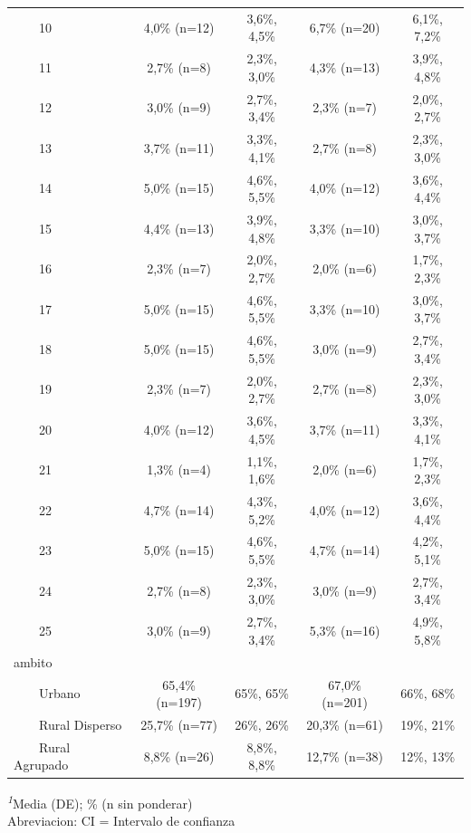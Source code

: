 \documentclass[
  spanish,
  a4paper,
]{scrreprt}
\begin{document}
\begin{table}
{\begin{tabular*}{\linewidth}{@{\extracolsep{\fill}}lcccc}
    10 & 4,0\% (n=12) & 3,6\%, 4,5\% & 6,7\% (n=20) & 6,1\%, 7,2\% \\ 
    11 & 2,7\% (n=8) & 2,3\%, 3,0\% & 4,3\% (n=13) & 3,9\%, 4,8\% \\ 
    12 & 3,0\% (n=9) & 2,7\%, 3,4\% & 2,3\% (n=7) & 2,0\%, 2,7\% \\ 
    13 & 3,7\% (n=11) & 3,3\%, 4,1\% & 2,7\% (n=8) & 2,3\%, 3,0\% \\ 
    14 & 5,0\% (n=15) & 4,6\%, 5,5\% & 4,0\% (n=12) & 3,6\%, 4,4\% \\ 
    15 & 4,4\% (n=13) & 3,9\%, 4,8\% & 3,3\% (n=10) & 3,0\%, 3,7\% \\ 
    16 & 2,3\% (n=7) & 2,0\%, 2,7\% & 2,0\% (n=6) & 1,7\%, 2,3\% \\ 
    17 & 5,0\% (n=15) & 4,6\%, 5,5\% & 3,3\% (n=10) & 3,0\%, 3,7\% \\ 
    18 & 5,0\% (n=15) & 4,6\%, 5,5\% & 3,0\% (n=9) & 2,7\%, 3,4\% \\ 
    19 & 2,3\% (n=7) & 2,0\%, 2,7\% & 2,7\% (n=8) & 2,3\%, 3,0\% \\ 
    20 & 4,0\% (n=12) & 3,6\%, 4,5\% & 3,7\% (n=11) & 3,3\%, 4,1\% \\ 
    21 & 1,3\% (n=4) & 1,1\%, 1,6\% & 2,0\% (n=6) & 1,7\%, 2,3\% \\ 
    22 & 4,7\% (n=14) & 4,3\%, 5,2\% & 4,0\% (n=12) & 3,6\%, 4,4\% \\ 
    23 & 5,0\% (n=15) & 4,6\%, 5,5\% & 4,7\% (n=14) & 4,2\%, 5,1\% \\ 
    24 & 2,7\% (n=8) & 2,3\%, 3,0\% & 3,0\% (n=9) & 2,7\%, 3,4\% \\ 
    25 & 3,0\% (n=9) & 2,7\%, 3,4\% & 5,3\% (n=16) & 4,9\%, 5,8\% \\ 
ambito &  &  &  &  \\ 
    Urbano & 65,4\% (n=197) & 65\%, 65\% & 67,0\% (n=201) & 66\%, 68\% \\ 
    Rural Disperso & 25,7\% (n=77) & 26\%, 26\% & 20,3\% (n=61) & 19\%, 21\% \\ 
    Rural Agrupado & 8,8\% (n=26) & 8,8\%, 8,8\% & 12,7\% (n=38) & 12\%, 13\% \\ 
\bottomrule
\end{tabular*}
\begin{minipage}{\linewidth}
\textsuperscript{\textit{1}}Media (DE); \% (n sin ponderar)\\
Abreviacion: CI = Intervalo de confianza\\
\end{minipage}

}

\end{table}%
\end{document}
